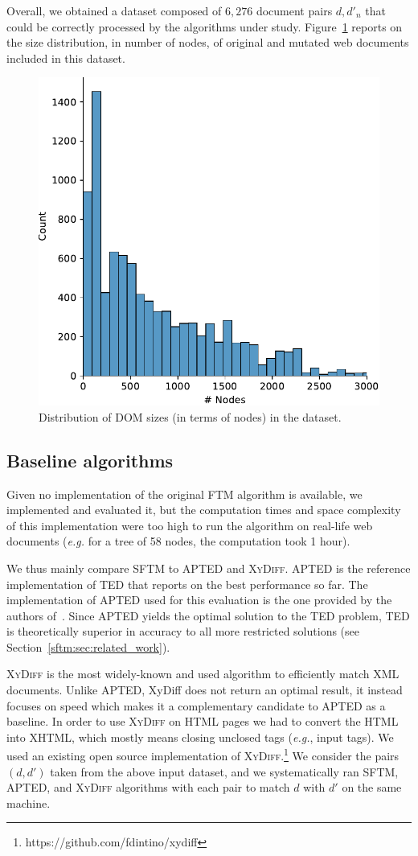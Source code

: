 Overall, we obtained a dataset composed of $6,276$ document pairs $d,d'_n$ that could be correctly processed by the algorithms under study.
Figure~\ref{sftm:fig:distribution} reports on the size distribution, in number of nodes, of original and mutated web documents included in this dataset.

\begin{figure}
    \centering
    \includegraphics[width=.6\linewidth]{tree-matching/graphs/distribution_size}
    \caption{Distribution of DOM sizes (in terms of nodes) in the dataset.}
    \label{sftm:fig:distribution}
\end{figure}

\subsection{Baseline algorithms}
Given no implementation of the original FTM algorithm is available, we implemented and evaluated it, but the computation times and space complexity of this implementation were too high to run the algorithm on real-life web documents (\emph{e.g.} for a tree of 58 nodes, the computation took 1 hour).

We thus mainly compare SFTM to APTED and \textsc{XyDiff}.
APTED is the reference implementation of TED that reports on the best performance so far.
The implementation of APTED used for this evaluation is the one provided by the authors of~\cite{pawlik2016tree,pawlik2015efficient}.
Since APTED yields the optimal solution to the TED problem, TED is theoretically superior in accuracy to all more restricted solutions (see Section~\ref{sftm:sec:related_work}).

\textsc{XyDiff} is the most widely-known and used algorithm to efficiently match XML documents. Unlike APTED, XyDiff does not return an optimal result, it instead focuses on speed which makes it a complementary candidate to APTED as a baseline. 
In order to use \textsc{XyDiff} on HTML pages we had to convert the HTML into XHTML, which mostly means closing unclosed tags (\emph{e.g.}, input tags).
We used an existing open source implementation of \textsc{XyDiff}.\footnote{https://github.com/fdintino/xydiff}
We consider the pairs $(d,d')$ taken from the above input dataset, and we systematically ran SFTM, APTED, and \textsc{XyDiff} algorithms with each pair to match $d$ with $d'$ on the same machine.

